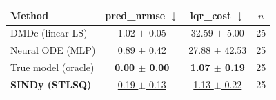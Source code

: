 \begin{tabular}{lccc}
\toprule
Method & pred\_nrmse $\downarrow$ & lqr\_cost $\downarrow$ & $n$ \\
\midrule
DMDc (linear LS) & 1.02 $\pm$ 0.05 & 32.59 $\pm$ 5.00 & 25 \\
Neural ODE (MLP) & 0.89 $\pm$ 0.42 & 27.88 $\pm$ 42.53 & 25 \\
True model (oracle) & \textbf{0.00 $\pm$ 0.00} & \textbf{1.07 $\pm$ 0.19} & 25 \\
\textbf{SINDy (STLSQ)} & \underline{0.19 $\pm$ 0.13} & \underline{1.13 $\pm$ 0.22} & 25 \\
\bottomrule
\end{tabular}
